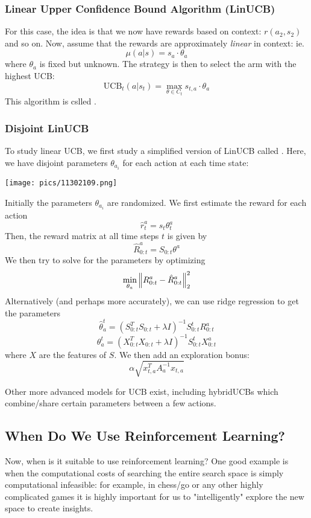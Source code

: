 \documentclass[11pt]{scrartcl}
\begin{document}
\subsubsection{Linear Upper Confidence Bound Algorithm (LinUCB)}

For this case, the idea is that we now have rewards based on context: $r(a_2,s_2)$ and so on. Now, assume that the rewards are approximately \textit{linear} in context: ie. $$\mu(a|s)=s_a\cdot \theta_{a}$$ where $\theta_{a}$ is fixed but unknown. The strategy is then to select the arm with the highest UCB: $$\text{UCB}_{t}(a|s_t)=\max_{\theta \in C_t}s_{t,a}\cdot\theta_{a}$$
This algorithm is cslled .

\subsubsection{Disjoint LinUCB}
To study linear UCB, we first study a simplified version of LinUCB called . Here, we have disjoint parameters $\theta_{a_i}$ for each action at each time state:
\begin{center}
    \texttt{[image: pics/11302109.png]}
\end{center}
Initially the parameters $\theta_{a_i}$ are randomized. We first estimate the reward for each action $$\hat{r}_{t}^{a}=s_{t}\theta_{t}^{a}$$
Then, the reward matrix at all time steps $t$ is given by $$\hat{R}^{a}_{0:t}=S_{0:t}\theta^a$$
We then try to solve for the parameters by optimizing $$\min_{\theta_a}\left\lVert R^{a}_{0:t}-\hat{R}^{a}_{0:t}\right\rVert_2^{2}$$
Alternatively (and perhaps more accurately), we can use ridge regression to get the parameters $$\hat{\theta}^{t}_{a}=(S^{T}_{0:t}S_{0:t}+\lambda{I})^{-1}S^{t}_{0:t}R^{a}_{0:t}$$
$$\theta^{t}_{a}=(X^{T}_{0:t}X_{0:t}+\lambda{I})^{-1}S^{t}_{0:t}X^{a}_{0:t}$$
where $X$ are the features of $S$. We then add an exploration bonus: 
$$\alpha\sqrt{x^{T}_{t,a}A_{a}^{-1}x_{t,a}}$$

Other more advanced models for UCB exist, including hybridUCBs which combine/share certain parameters between a few actions. 

\subsection{When Do We Use Reinforcement Learning?}

Now, when is it suitable to use reinforcement learning? One good example is when the computational costs of searching the entire search space is simply computational infeasible: for example, in chess/go or any other highly complicated games it is highly important for us to "intelligently" explore the new space to create insights. 
\end{document}
